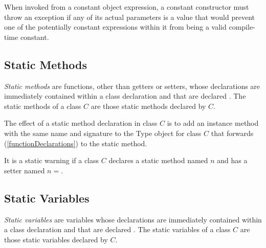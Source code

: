 \documentclass{article}
\newcommand{\code}[1]{{\sf #1}}
\begin{document}
\LMHash{}
When invoked from a constant object expression, a constant constructor must throw an exception if any of its actual parameters is a value that would prevent one of the potentially constant expressions within it from being a valid compile-time constant.


\subsection{Static Methods}

\LMHash{}
{\em Static methods} are functions, other than getters or setters, whose declarations are immediately contained within a class declaration and that are declared \STATIC{}. The static methods of a class $C$ are those static methods declared by $C$.

\LMHash{}
The effect of a static method declaration in class $C$ is to add an instance method with the same name and signature to the \code{Type} object for class $C$ that forwards (\ref{functionDeclarations})  to the static method.


\LMHash{}
It is a static warning if a class $C$ declares a static method named $n$ and has a setter named $n=$.


\subsection{Static Variables}

\LMHash{}
{\em Static variables} are variables whose declarations are immediately contained within a class declaration and that are declared \STATIC{}. The static variables of a class $C$ are those static variables declared by $C$.

\end{document}
